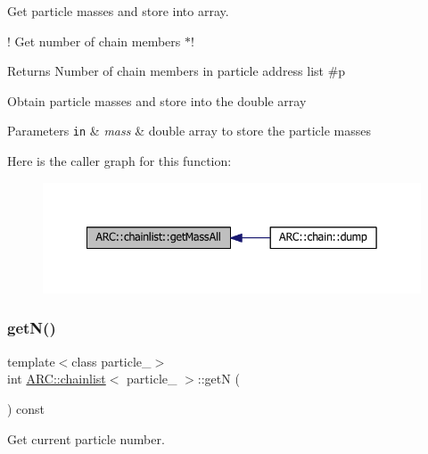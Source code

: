 Get particle masses and store into array. 

! Get number of chain members $\ast$! \begin{DoxyReturn}{Returns}
Number of chain members in particle address list \#p
\end{DoxyReturn}
Obtain particle masses and store into the double array 
\begin{DoxyParams}[1]{Parameters}
\mbox{\tt in}  & {\em mass} & double array to store the particle masses \\
\hline
\end{DoxyParams}
Here is the caller graph for this function\+:
\nopagebreak
\begin{figure}[H]
\begin{center}
\leavevmode
\includegraphics[width=342pt]{classARC_1_1chainlist_a85bba1921256d2a1a6784006927ad397_icgraph}
\end{center}
\end{figure}
\hypertarget{classARC_1_1chainlist_a461f4b2936307305b9092a4f81197e6b}{}\label{classARC_1_1chainlist_a461f4b2936307305b9092a4f81197e6b} 
\subsubsection{\texorpdfstring{get\+N()}{getN()}}
{\footnotesize\ttfamily template$<$class particle\+\_\+$>$ \\
int \hyperlink{classARC_1_1chainlist}{A\+R\+C\+::chainlist}$<$ particle\+\_\+ $>$\+::getN (\begin{DoxyParamCaption}{ }\end{DoxyParamCaption}) const\hspace{0.3cm}{\ttfamily [inline]}}



Get current particle number. 


